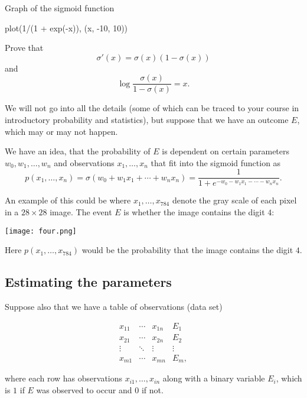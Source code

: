 \documentclass{article}
\begin{document}
\begin{hideinbutton}{Graph of the sigmoid function}
  \begin{sage}
    plot(1/(1 + exp(-x)), (x, -10, 10))
  \end{sage}
\end{hideinbutton}


\beginshex
Prove that
$$
\sigma'(x) =  \sigma(x) (1-\sigma(x))
$$
and
$$
\log \frac{\sigma(x)}{1-\sigma(x)} = x.
$$
\endshex

We will not go into all the details (some of which can be traced
to your course in introductory probability and statistics), but
suppose that we have an outcome $E$, which may or may not happen.

We have an idea, that the probability of $E$ is
dependent on certain parameters $w_0, w_1, \dots, w_n$ and
observations $x_1, \dots, x_n$ that fit into the sigmoid function as
\begin{equation}\label{probdist}
p(x_1, \dots, x_n) = \sigma(w_0 + w_1 x_1 + \cdots + w_n x_n) = \frac{1}{1 + e^{-w_0 - w_1 x_1 - \cdots - w_n x_n}}.
\end{equation}

An example of this could be where $x_1, \dots, x_{784}$ denote the
gray scale of each pixel in a $28\times 28$ image. The event $E$
is whether the image contains the digit $4$:

\texttt{[image: four.png]}

Here $p(x_1, \dots, x_{784})$ would be the probability that the image contains the digit $4$.

\subsection{Estimating the parameters}

Suppose also that we have a table of observations (data set)

\begin{equation}\label{mnist}
\begin{matrix}
  x_{11} & \cdots & x_{1n} & E_1\\
  x_{21} & \cdots & x_{2n} & E_2\\
  \vdots & \ddots & \vdots & \vdots\\
  x_{m1} & \cdots & x_{mn} & E_m,
\end{matrix}
\end{equation}

where each row has observations $x_{i1}, \dots, x_{in}$ along with a
binary variable $E_i$, which is $1$ if $E$ was observed to occur and
$0$ if not.
\end{document}
